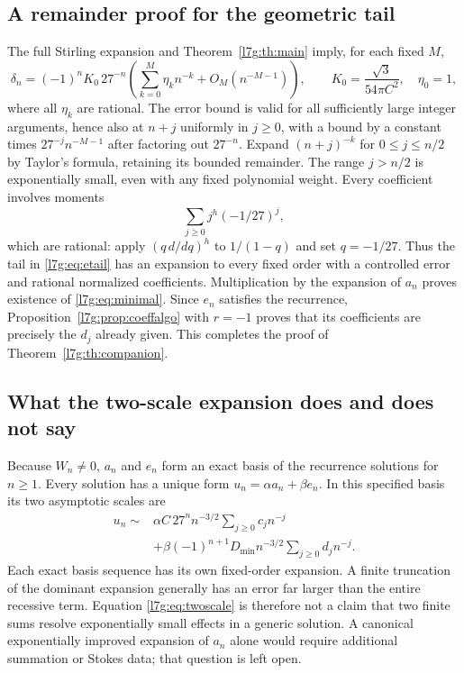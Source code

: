 \documentclass[11pt,letterpaper]{article}
\theoremstyle{remark}\newtheorem{remark}[theorem]{Remark}
\newcounter{l7gtrsavedeq}
\begin{document}
\subsection{A remainder proof for the geometric tail}
The full Stirling expansion and Theorem~\ref{l7g:th:main} imply, for each
fixed $M$,
\[
 \delta_n=(-1)^nK_0\,27^{-n}
 \left(\sum_{k=0}^M\eta_kn^{-k}+O_M(n^{-M-1})\right),
 \qquad K_0=\frac{\sqrt3}{54\pi C^2},\quad\eta_0=1,
\]
where all $\eta_k$ are rational. The error bound is valid for all
sufficiently large integer arguments, hence also at $n+j$ uniformly in
$j\ge0$, with a bound by a constant times $27^{-j}n^{-M-1}$ after
factoring out $27^{-n}$.
Expand $(n+j)^{-k}$ for $0\le j\le n/2$ by Taylor's formula, retaining
its bounded remainder. The range $j>n/2$ is exponentially small, even
with any fixed polynomial weight. Every coefficient involves moments
\[
 \sum_{j\ge0}j^h(-1/27)^j,
\]
which are rational: apply $(q\,d/dq)^h$ to $1/(1-q)$ and set $q=-1/27$.
Thus the tail in \eqref{l7g:eq:etail} has an expansion to every fixed order
with a controlled error and rational normalized coefficients.
Multiplication by the expansion of $a_n$ proves existence of
\eqref{l7g:eq:minimal}. Since $e_n$ satisfies the recurrence,
Proposition~\ref{l7g:prop:coeffalgo} with $r=-1$ proves that its coefficients
are precisely the $d_j$ already given. This completes the proof of
Theorem~\ref{l7g:th:companion}.

\subsection{What the two-scale expansion does and does not say}
Because $W_n\ne0$, $a_n$ and $e_n$ form an exact basis of the recurrence
solutions for $n\ge1$. Every solution has a unique form
$u_n=\alpha a_n+\beta e_n$. In this specified basis its two asymptotic
scales are
\begin{equation}\label{l7g:eq:twoscale}
\begin{split}
 u_n\sim{}&\alpha C\,27^nn^{-3/2}\sum_{j\ge0}c_jn^{-j}\\
          &+\beta(-1)^{n+1}D_{\min}n^{-3/2}\sum_{j\ge0}d_jn^{-j}.
\end{split}
\end{equation}
Each exact basis sequence has its own fixed-order expansion. A finite
truncation of the dominant expansion generally has an error far larger
than the entire recessive term. Equation \eqref{l7g:eq:twoscale} is therefore
not a claim that two finite sums resolve exponentially small effects in
a generic solution. A canonical exponentially improved expansion of
$a_n$ alone would require additional summation or Stokes data; that
question is left open.
\end{document}
